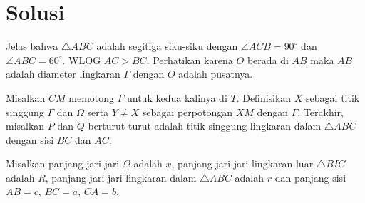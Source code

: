     \newpage

    \section{Solusi}
    Jelas bahwa $\triangle ABC$ adalah segitiga siku-siku dengan $\angle ACB = 90^\circ$ dan $\angle ABC=60^\circ$. WLOG $AC > BC$. Perhatikan karena $O$ berada di $AB$ maka $AB$ adalah diameter lingkaran $\Gamma$ dengan $O$ adalah pusatnya.
    
    Misalkan $CM$ memotong $\Gamma$ untuk kedua kalinya di $T$. Definisikan $X$ sebagai titik singgung $\Gamma$ dan $\Omega$ serta $Y \neq X$ sebagai perpotongan $XM$ dengan $\Gamma$. Terakhir, misalkan $P$ dan $Q$ berturut-turut adalah titik singgung lingkaran dalam $\triangle ABC$ dengan sisi $BC$ dan $AC$.

    Misalkan panjang jari-jari $\Omega$ adalah $x$, panjang jari-jari lingkaran luar $\triangle BIC$ adalah $R$, panjang jari-jari lingkaran dalam $\triangle ABC$ adalah $r$ dan panjang sisi $AB=c$, $BC=a$, $CA=b$.

